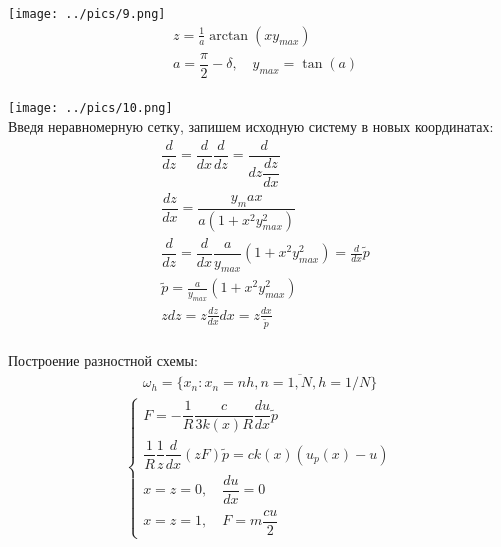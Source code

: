 \documentclass[12pt,a4paper]{article}
\begin{document}
	\texttt{[image: ../pics/9.png]}\\
	\begin{align*}
	&z = \frac{1}{a} \arctan (x y_{max})\\
	&a = \dfrac{\pi}{2} - \delta, \quad y_{max} = \tan (a)
	\end{align*}\\
	\texttt{[image: ../pics/10.png]}\\
	Введя неравномерную сетку, запишем исходную систему в новых координатах:\\
	\begin{align*}
	&\dfrac{d}{dz} = \dfrac{d}{dx} \dfrac{d}{dz} = \dfrac{d}{dz\dfrac{dz}{dx}}\\
	&\dfrac{dz}{dx} = \dfrac{y_max}{a(1+x^2 y^2_{max})}\\
	& \dfrac{d}{dz} = \dfrac{d}{dx} \dfrac{a}{y_{max}} \left( 1 + x^2 y^2_{max} \right) = \frac{d}{dx} \tilde{p}\\
	&\tilde{p} = \frac{a}{y_{max}} \left( 1 + x^2 y^2_{max}\right)\\
	&zdz = z \frac{dz}{dx}dx = z \frac{dx}{\tilde{p}}
	\end{align*}\\
	Построение разностной схемы:
	\begin{align*}
	\omega_h = \{x_n : x_n = nh, n = \overline{1, N}, h = 1/N \}
	\end{align*}
	\begin{align*}
	\begin{cases}
	F = - \dfrac{1}{R}\dfrac{c}{3k(x)R} \dfrac{d u}{dx}\tilde{p}\\
	\dfrac{1}{R}\dfrac{1}{z} \dfrac{d}{dx}(zF)\tilde{p}=c k(x) (u_p(x) - u)\\
	x = z = 0, \quad \dfrac{du}{dx} = 0 \\
	x = z = 1, \quad F = m \dfrac{cu}{2}
	\end{cases}
	\end{align*}
\end{document}

